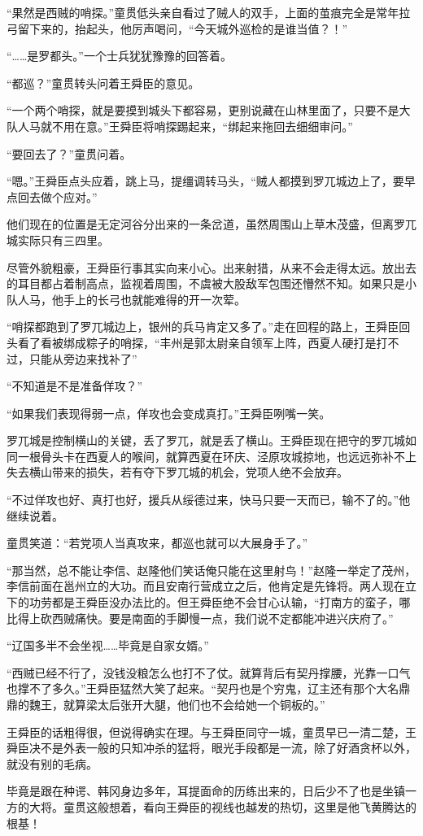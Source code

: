 “果然是西贼的哨探。”童贯低头亲自看过了贼人的双手，上面的茧痕完全是常年拉弓留下来的，抬起头，他厉声喝问，“今天城外巡检的是谁当值？！”

“……是罗都头。”一个士兵犹犹豫豫的回答着。

“都巡？”童贯转头问着王舜臣的意见。

“一个两个哨探，就是要摸到城头下都容易，更别说藏在山林里面了，只要不是大队人马就不用在意。”王舜臣将哨探踢起来，“绑起来拖回去细细审问。”

“要回去了？”童贯问着。

“嗯。”王舜臣点头应着，跳上马，提缰调转马头，“贼人都摸到罗兀城边上了，要早点回去做个应对。”

他们现在的位置是无定河谷分出来的一条岔道，虽然周围山上草木茂盛，但离罗兀城实际只有三四里。

尽管外貌粗豪，王舜臣行事其实向来小心。出来射猎，从来不会走得太远。放出去的耳目都占着制高点，监视着周围，不虞被大股敌军包围还懵然不知。如果只是小队人马，他手上的长弓也就能难得的开一次荤。

“哨探都跑到了罗兀城边上，银州的兵马肯定又多了。”走在回程的路上，王舜臣回头看了看被绑成粽子的哨探，“丰州是郭太尉亲自领军上阵，西夏人硬打是打不过，只能从旁边来找补了”

“不知道是不是准备佯攻？”

“如果我们表现得弱一点，佯攻也会变成真打。”王舜臣咧嘴一笑。

罗兀城是控制横山的关键，丢了罗兀，就是丢了横山。王舜臣现在把守的罗兀城如同一根骨头卡在西夏人的喉间，就算西夏在环庆、泾原攻城掠地，也远远弥补不上失去横山带来的损失，若有夺下罗兀城的机会，党项人绝不会放弃。

“不过佯攻也好、真打也好，援兵从绥德过来，快马只要一天而已，输不了的。”他继续说着。

童贯笑道：“若党项人当真攻来，都巡也就可以大展身手了。”

“那当然，总不能让李信、赵隆他们笑话俺只能在这里射鸟！”赵隆一举定了茂州，李信前面在邕州立的大功。而且安南行营成立之后，他肯定是先锋将。两人现在立下的功劳都是王舜臣没办法比的。但王舜臣绝不会甘心认输，“打南方的蛮子，哪比得上砍西贼痛快。要是南面的手脚慢一点，我们说不定都能冲进兴庆府了。”

“辽国多半不会坐视……毕竟是自家女婿。”

“西贼已经不行了，没钱没粮怎么也打不了仗。就算背后有契丹撑腰，光靠一口气也撑不了多久。”王舜臣猛然大笑了起来。“契丹也是个穷鬼，辽主还有那个大名鼎鼎的魏王，就算梁太后张开大腿，他们也不会给她一个铜板的。”

王舜臣的话粗得很，但说得确实在理。与王舜臣同守一城，童贯早已一清二楚，王舜臣决不是外表一般的只知冲杀的猛将，眼光手段都是一流，除了好酒贪杯以外，就没有别的毛病。

毕竟是跟在种谔、韩冈身边多年，耳提面命的历练出来的，日后少不了也是坐镇一方的大将。童贯这般想着，看向王舜臣的视线也越发的热切，这里是他飞黄腾达的根基！

